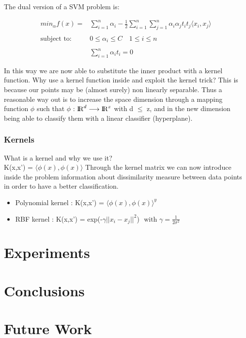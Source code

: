 \documentclass{article}
\begin{document}
The dual version of a SVM problem is:

\begin{equation}\label{eq:min}
\begin{split}
min_\alpha f(x) =& \sum_{i=1}^n \alpha_i -\frac{1}{2} \sum_{i=1}^n \sum_{j=1}^n \alpha_i \alpha_j t_i t_j \langle x_i,x_j\rangle  \\\\[-1em]
\text{subject to: }& 0 \leq \alpha_i \leq C \quad 1\leq  i\leq n \\\\[-1em] 
&\sum_{i=1}^n \alpha_i t_i = 0
\end{split}
\end{equation}

In this way we are now able to substitute the inner product with a kernel function. Why use a kernel function inside and exploit the kernel trick?
This is because our points may be (almost surely) non linearly separable. Thus a reasonable way out is to increase the space dimension through a mapping function $\phi$ such that $\phi$ : ${\rm I\!R}^d \longrightarrow {\rm I\!R}^z $ with d $\leq$ z, and in the new dimension being able to classify them with a linear classifier (hyperplane).

\subsubsection{Kernels}
What is a kernel and why we use it? \\
K(x,x') = $\langle \phi(x), \phi(x) \rangle$
Through the kernel matrix we can now introduce inside the problem information about dissimilarity measure between data points in order to have a better classification.


\begin{itemize}
    \item Polynomial kernel : K(x,x') = $\langle \phi(x), \phi(x) \rangle^y$ 
    \item RBF kernel : K(x,x') = exp(-$\gamma||x_i - x_j||^2$) $\text{ with } \gamma=\frac{1}{2\sigma^2}$
\end{itemize}


\section{Experiments}


\section{Conclusions}


\section{Future Work}


\newpage
\nocite{*}


\end{document}
